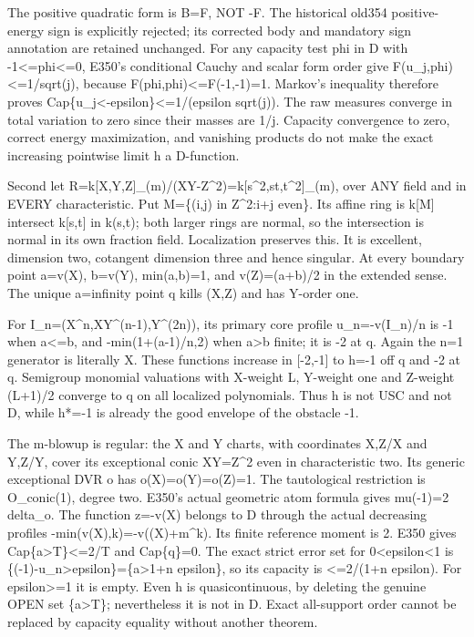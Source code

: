 \documentclass[11pt]{article}
\begin{document}
The positive quadratic form is B=F, NOT -F. The historical old354 positive-energy sign is explicitly rejected; its corrected body and mandatory sign annotation are retained unchanged. For any capacity test phi in D with -1<=phi<=0, E350's conditional Cauchy and scalar form order give F(u\_j,phi)<=1/sqrt(j), because F(phi,phi)<=F(-1,-1)=1. Markov's inequality therefore proves Cap\{u\_j<-epsilon\}<=1/(epsilon sqrt(j)). The raw measures converge in total variation to zero since their masses are 1/j. Capacity convergence to zero, correct energy maximization, and vanishing products do not make the exact increasing pointwise limit h a D-function.

Second let R=k[X,Y,Z]\_(m)/(XY-Z\textasciicircum{}2)=k[s\textasciicircum{}2,st,t\textasciicircum{}2]\_(m), over ANY field and in EVERY characteristic. Put M=\{(i,j) in Z\textasciicircum{}2:i+j even\}. Its affine ring is k[M] intersect k[s,t] in k(s,t); both larger rings are normal, so the intersection is normal in its own fraction field. Localization preserves this. It is excellent, dimension two, cotangent dimension three and hence singular. At every boundary point a=v(X), b=v(Y), min(a,b)=1, and v(Z)=(a+b)/2 in the extended sense. The unique a=infinity point q kills (X,Z) and has Y-order one.

For I\_n=(X\textasciicircum{}n,XY\textasciicircum{}(n-1),Y\textasciicircum{}(2n)), its primary core profile u\_n=-v(I\_n)/n is -1 when a<=b, and -min(1+(a-1)/n,2) when a>b finite; it is -2 at q. Again the n=1 generator is literally X. These functions increase in [-2,-1] to h=-1 off q and -2 at q. Semigroup monomial valuations with X-weight L, Y-weight one and Z-weight (L+1)/2 converge to q on all localized polynomials. Thus h is not USC and not D, while h*=-1 is already the good envelope of the obstacle -1.

The m-blowup is regular: the X and Y charts, with coordinates X,Z/X and Y,Z/Y, cover its exceptional conic XY=Z\textasciicircum{}2 even in characteristic two. Its generic exceptional DVR o has o(X)=o(Y)=o(Z)=1. The tautological restriction is O\_conic(1), degree two. E350's actual geometric atom formula gives mu(-1)=2 delta\_o. The function z=-v(X) belongs to D through the actual decreasing profiles -min(v(X),k)=-v((X)+m\textasciicircum{}k). Its finite reference moment is 2. E350 gives Cap\{a>T\}<=2/T and Cap\{q\}=0. The exact strict error set for 0<epsilon<1 is \{(-1)-u\_n>epsilon\}=\{a>1+n epsilon\}, so its capacity is <=2/(1+n epsilon). For epsilon>=1 it is empty. Even h is quasicontinuous, by deleting the genuine OPEN set \{a>T\}; nevertheless it is not in D. Exact all-support order cannot be replaced by capacity equality without another theorem.
\end{document}
